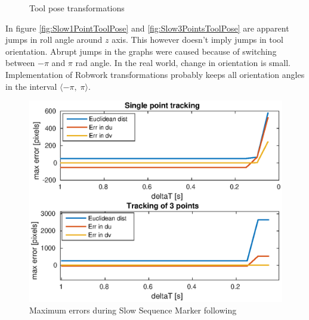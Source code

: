 \documentclass[]{scrartcl}
\begin{document}
\begin{figure}[!h]
	\hfill
	\caption{Tool pose transformations}
	\label{fig:SlowSequenceToolPose}
\end{figure}
In figure \ref{fig:Slow1PointToolPose} and \ref{fig:Slow3PointsToolPose} are apparent jumps in roll angle around $z$ axis. This however doesn't imply jumps in tool orientation. Abrupt jumps in the graphs were caused because of switching between $-\pi$ and $\pi$ rad angle. In the real world, change in orientation is small. Implementation of Robwork transformations probably keeps all orientation angles in the interval $ \langle -\pi, \; \pi \rangle $.

\vspace{0.5cm}
\begin{figure}
	\centering
	\includegraphics[width=0.7\linewidth]{fig/SlowSequence_errors.eps}
	\caption{Maximum errors during Slow Sequence Marker following}
	\label{fig:SlowSequence_errors}
\end{figure}
\end{document}
